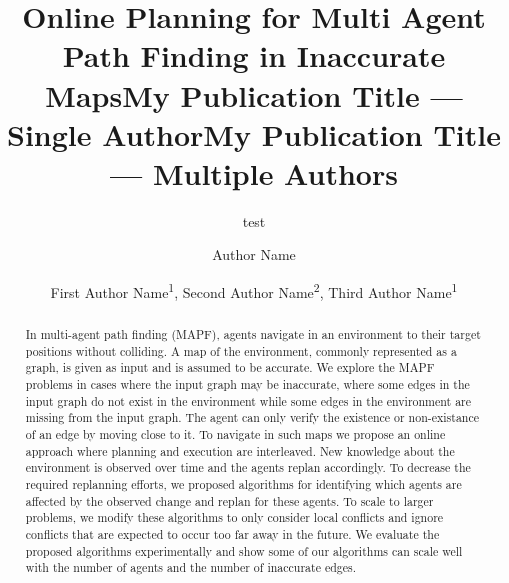 \documentclass[letterpaper]{article} %
\title{Online Planning for Multi Agent Path Finding in Inaccurate Maps}
\author{
    test
}
\title{My Publication Title --- Single Author}
\author {
    Author Name
}
\title{My Publication Title --- Multiple Authors}
\author {
    First Author Name\textsuperscript{\rm 1},
    Second Author Name\textsuperscript{\rm 2},
    Third Author Name\textsuperscript{\rm 1}
}
\def\
UrlFont{\rm}  %
\newcommand{\nir}[1]{\textbf{[\color{blue}NIR:#1]}}
\newcommand{\commentout}[1]{}
\theoremstyle{definition}
\begin{document}
\maketitle

\begin{abstract}
In multi-agent path finding (MAPF), agents navigate in an environment to their target positions without colliding. A map of the environment, commonly represented as a graph, is given as input and is assumed to be accurate.
We explore the MAPF problems in cases where the input graph may be inaccurate, where some edges in the input graph do not exist in the environment while some edges in the environment are missing from the input graph.
The agent can only verify the existence or non-existance of an edge by moving close to it.
To navigate in such maps we propose an online approach where planning and execution are interleaved.
New knowledge about the environment is observed over time and the agents replan accordingly.
To decrease the required replanning efforts, we proposed algorithms for identifying which agents are affected by the observed change and replan for these agents.
To scale to larger problems, we modify these algorithms to only consider local conflicts and ignore conflicts that are expected to occur too far away in the future.
We evaluate the proposed algorithms experimentally and show some of our algorithms can scale well with the number of agents and the number of inaccurate edges.


\commentout{

}
\end{abstract}
\end{document}

